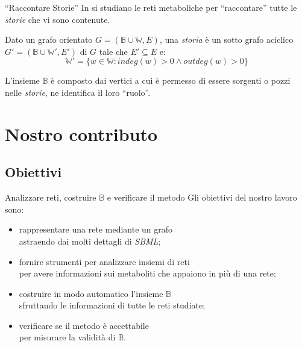 \documentclass{beamer}
\begin{document}
\begin{frame}{``Raccontare Storie''}
In \cite{Crescenzi-Marino} si studiano le reti metaboliche per
``raccontare'' tutte le \emph{storie} che vi sono contenute.
\begin{definition}
  Dato un grafo orientato $G = (\mathbb{B} \cup \mathbb{W}, E)$, una
  \emph{storia} \`e un sotto grafo aciclico $G' = (\mathbb{B} \cup
  \mathbb{W'}, E')$ di $G$ tale che $E' \subseteq E $ e:
  \begin{displaymath}
    \mathbb{W'} = \{w \in \mathbb{W}: indeg(w) > 0 \wedge outdeg(w)
    > 0\}
  \end{displaymath}
\end{definition}
L'insieme $\mathbb{B}$ \`e composto dai vertici a cui \`e permesso di
essere sorgenti o pozzi nelle \emph{storie}, ne identifica il loro
``ruolo''.
\end{frame}

\section{Nostro contributo}

\subsection{Obiettivi}

\begin{frame}{Analizzare reti, costruire $\mathbb{B}$ e verificare il
    metodo}
Gli obiettivi del nostro lavoro sono:
\begin{itemize}
\item<1-> rappresentare una rete mediante un grafo\\
  \footnotesize{astraendo dai molti dettagli di \emph{SBML}};
\item<2-> fornire strumenti per analizzare insiemi di reti\\
  \footnotesize{per avere informazioni sui metaboliti che appaiono in
    pi\`u di una rete};
\item<3-> costruire in modo automatico l'insieme $\mathbb{B}$\\
  \footnotesize{sfruttando le informazioni di tutte le reti studiate};
\item<4-> verificare se il metodo \`e accettabile\\
  \footnotesize{per misurare la validit\`a di $\mathbb{B}$}.
\end{itemize}
\end{frame}
\end{document}
